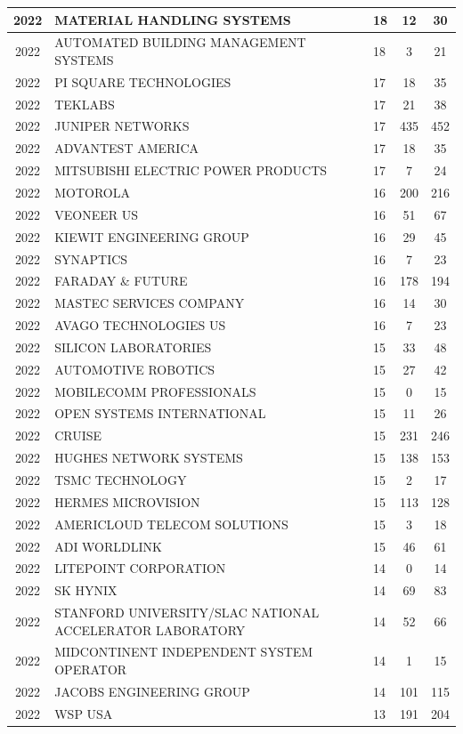 \documentclass{article}%
\begin{document}
\begin{longtable}{c|p{20em}|p{5em}|c|c}
\hline%
2022&MATERIAL HANDLING SYSTEMS&18&12&30\\%
\hline%
2022&AUTOMATED BUILDING MANAGEMENT SYSTEMS&18&3&21\\%
\hline%
2022&PI SQUARE TECHNOLOGIES&17&18&35\\%
\hline%
2022&TEKLABS&17&21&38\\%
\hline%
2022&JUNIPER NETWORKS&17&435&452\\%
\hline%
2022&ADVANTEST AMERICA&17&18&35\\%
\hline%
2022&MITSUBISHI ELECTRIC POWER PRODUCTS&17&7&24\\%
\hline%
2022&MOTOROLA&16&200&216\\%
\hline%
2022&VEONEER US&16&51&67\\%
\hline%
2022&KIEWIT ENGINEERING GROUP&16&29&45\\%
\hline%
2022&SYNAPTICS&16&7&23\\%
\hline%
2022&FARADAY \& FUTURE&16&178&194\\%
\hline%
2022&MASTEC SERVICES COMPANY&16&14&30\\%
\hline%
2022&AVAGO TECHNOLOGIES US&16&7&23\\%
\hline%
2022&SILICON LABORATORIES&15&33&48\\%
\hline%
2022&AUTOMOTIVE ROBOTICS&15&27&42\\%
\hline%
2022&MOBILECOMM PROFESSIONALS&15&0&15\\%
\hline%
2022&OPEN SYSTEMS INTERNATIONAL&15&11&26\\%
\hline%
2022&CRUISE&15&231&246\\%
\hline%
2022&HUGHES NETWORK SYSTEMS&15&138&153\\%
\hline%
2022&TSMC TECHNOLOGY&15&2&17\\%
\hline%
2022&HERMES MICROVISION&15&113&128\\%
\hline%
2022&AMERICLOUD TELECOM SOLUTIONS&15&3&18\\%
\hline%
2022&ADI WORLDLINK&15&46&61\\%
\hline%
2022&LITEPOINT CORPORATION&14&0&14\\%
\hline%
2022&SK HYNIX&14&69&83\\%
\hline%
2022&STANFORD UNIVERSITY/SLAC NATIONAL ACCELERATOR LABORATORY&14&52&66\\%
\hline%
2022&MIDCONTINENT INDEPENDENT SYSTEM OPERATOR&14&1&15\\%
\hline%
2022&JACOBS ENGINEERING GROUP&14&101&115\\%
\hline%
2022&WSP USA&13&191&204\\%

\end{longtable}
\end{document}
